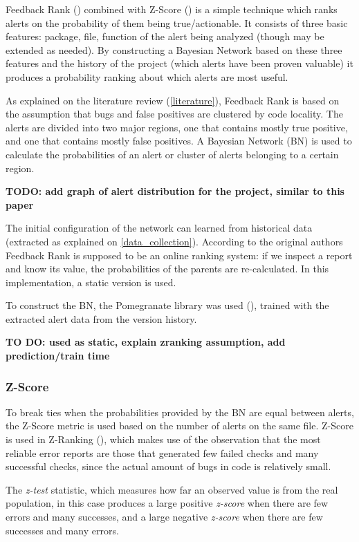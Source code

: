 Feedback Rank (\cite{correlation_exploitation}) combined with Z-Score (\cite{z-ranking}) is a simple technique which ranks alerts on the probability of them being true/actionable. It consists of three basic features: package, file, function of the alert being analyzed (though may be extended as needed).
By constructing a Bayesian Network based on these three features and the history of the project (which alerts have been proven valuable) it produces a probability ranking about which alerts are most useful.

As explained on the literature review (\cref{literature}), Feedback Rank is based on the assumption that bugs and false positives are clustered by code locality. The alerts are divided into two major regions, one that contains mostly true positive, and one that contains mostly false positives. A Bayesian Network (BN) is used to calculate the probabilities of an alert or cluster of alerts belonging to a certain region.

\textbf{TODO: add graph of alert distribution for the project, similar to this paper}

The initial configuration of the network can learned from historical data (extracted as explained on \cref{data_collection}). According to the original authors Feedback Rank is supposed to be an online ranking system: if we inspect a report and know its value, the probabilities of the parents are re-calculated. In this implementation, a static version is used.

To construct the BN, the Pomegranate library was used (\cite{pomegranate}), trained with the extracted alert data from the version history.

\textbf{TO DO: used as static, explain zranking assumption, add prediction/train time}


\subsubsection{Z-Score}
To break ties when the probabilities provided by the BN are equal between alerts, the Z-Score metric is used based on the number of alerts on the same file. Z-Score is used in Z-Ranking (\cite{z-ranking}), which makes use of the observation that the most reliable error reports are those that generated few failed checks and many successful checks, since the actual amount of bugs in code is relatively small. 

The \textit{z-test} statistic, which measures how far an observed value is from the real population, in this case produces a large positive \textit{z-score} when there are few errors and many successes, and a large negative \textit{z-score} when there are few successes and many errors.

